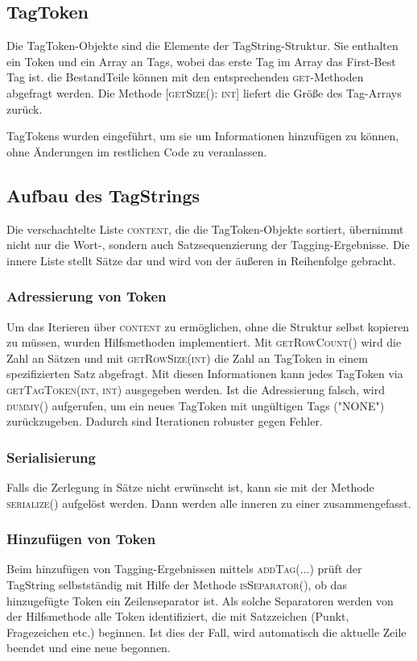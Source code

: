 \subsection{TagToken}
Die TagToken-Objekte sind die Elemente der TagString-Struktur. Sie enthalten ein Token und ein Array an Tags, wobei das erste Tag im Array das First-Best Tag ist. die BestandTeile können mit den entsprechenden \textsc{get}-Methoden abgefragt werden. Die Methode \textsc{[getSize(): int]} liefert die Größe des Tag-Arrays zurück.

TagTokens wurden eingeführt, um sie um Informationen hinzufügen zu können, ohne Änderungen im restlichen Code zu veranlassen.
\subsection{Aufbau des TagStrings}

Die verschachtelte Liste \textsc{content}, die die TagToken-Objekte sortiert, übernimmt nicht nur die Wort-, sondern auch Satzsequenzierung der Tagging-Ergebnisse. Die innere Liste stellt Sätze dar und wird von der äußeren in Reihenfolge gebracht. 

\subsubsection{Adressierung von Token}
Um das Iterieren über \textsc{content} zu ermöglichen, ohne die Struktur selbst kopieren zu müssen, wurden Hilfsmethoden implementiert. Mit \textsc{getRowCount()} wird die Zahl an Sätzen und mit \textsc{getRowSize(int)} die Zahl an TagToken in einem spezifizierten Satz abgefragt. Mit diesen Informationen kann jedes TagToken via \textsc{getTagToken(int, int)} ausgegeben werden. Ist die Adressierung falsch, wird \textsc{dummy()} aufgerufen, um ein neues TagToken mit ungültigen Tags ("NONE") zurückzugeben. Dadurch sind Iterationen robuster gegen Fehler.

\subsubsection{Serialisierung}
Falls die Zerlegung in Sätze nicht erwünscht ist, kann sie mit der Methode \textsc{serialize()} aufgelöst werden. Dann werden alle inneren zu einer zusammengefasst.

\subsubsection{Hinzufügen von Token}
Beim hinzufügen von Tagging-Ergebnissen mittels \textsc{addTag(...)} prüft der TagString selbstständig mit Hilfe der Methode \textsc{isSeparator()}, ob das hinzugefügte Token ein Zeilenseparator ist. Als solche Separatoren werden von der Hilfsmethode alle Token identifiziert, die mit Satzzeichen (Punkt, Fragezeichen etc.) beginnen. Ist dies der Fall, wird automatisch die aktuelle Zeile beendet und eine neue begonnen. 


